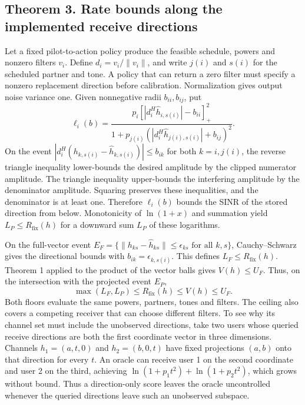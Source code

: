 \documentclass[10pt,letterpaper]{article}
\begin{document}
\subsection{Theorem 3. Rate bounds along the implemented receive directions}
Let a fixed pilot-to-action policy produce the feasible schedule, powers and nonzero filters $v_i$. Define $d_i=v_i/\|v_i\|$, and write $j(i)$ and $s(i)$ for the scheduled partner and tone. A policy that can return a zero filter must specify a nonzero replacement direction before calibration. Normalization gives output noise variance one. Given nonnegative radii $b_{ii},b_{ij}$, put
\begin{equation}
 \ell_i(b)=\frac{p_i[|d_i^H\hat h_{i,s(i)}|-b_{ii}]_+^2}
 {1+p_{j(i)}(|d_i^H\hat h_{j(i),s(i)}|+b_{ij})^2}.
 \label{supp:directional-lower}
\end{equation}
On the event $|d_i^H(h_{k,s(i)}-\hat h_{k,s(i)})|\le b_{ik}$ for both $k=i,j(i)$, the reverse triangle inequality lower-bounds the desired amplitude by the clipped numerator amplitude. The triangle inequality upper-bounds the interfering amplitude by the denominator amplitude. Squaring preserves these inequalities, and the denominator is at least one. Therefore $\ell_i(b)$ bounds the SINR of the stored direction from below. Monotonicity of $\ln(1+x)$ and summation yield $L_P\le R_{\mathrm{fix}}(h)$ for a downward sum $L_P$ of these logarithms.

On the full-vector event $E_F=\{\|h_{ks}-\hat h_{ks}\|\le\epsilon_{ks}\text{ for all }k,s\}$, Cauchy--Schwarz gives the directional bounds with $b_{ik}=\epsilon_{k,s(i)}$. This defines $L_F\le R_{\mathrm{fix}}(h)$. Theorem 1 applied to the product of the vector balls gives $V(h)\le U_F$. Thus, on the intersection with the projected event $E_P$,
\begin{equation}
 \max(L_F,L_P)\le R_{\mathrm{fix}}(h)\le V(h)\le U_F.
 \label{supp:theorem3}
\end{equation}
Both floors evaluate the same powers, partners, tones and filters. The ceiling also covers a competing receiver that can choose different filters. To see why its channel set must include the unobserved directions, take two users whose queried receive directions are both the first coordinate vector in three dimensions. Channels $h_1=(a,t,0)$ and $h_2=(b,0,t)$ have fixed projections $(a,b)$ onto that direction for every $t$. An oracle can receive user 1 on the second coordinate and user 2 on the third, achieving $\ln(1+p_1t^2)+\ln(1+p_2t^2)$, which grows without bound. Thus a direction-only score leaves the oracle uncontrolled whenever the queried directions leave such an unobserved subspace.
\end{document}
